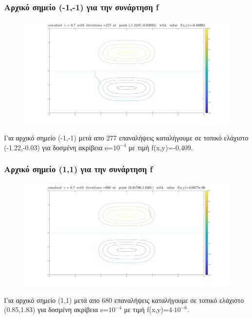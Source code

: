 \documentclass{article}
\begin{document}
\subsubsection*{Αρχικό σημείο (-1,-1) για την συνάρτηση f}
\begin{figure}[h!]	
     \centering  
     \advance\leftskip-0.2cm  
  \includegraphics[width=140mm,scale=2]{t1b.jpg}
\end{figure} 
Για αρχικό σημείο (-1,-1) μετά απο 277 επαναλήψεις καταλήγουμε σε τοπικό ελάχιστο (-1.22,-0.03) για  δοσμένη ακρίβεια e=$10^{-4}$ με τιμή f(x,y)=-0.409.
\clearpage
\subsubsection*{Αρχικό σημείο (1,1) για την συνάρτηση f}
\begin{figure}[h!]	
     \centering  
     \advance\leftskip-0.2cm  
  \includegraphics[width=140mm,scale=2]{t1c.jpg}
\end{figure} 
Για αρχικό σημείο (1,1) μετά απο 680 επαναλήψεις καταλήγουμε σε τοπικό ελάχιστο (0.85,1.83) για δοσμένη ακρίβεια e=$10^{-4}$ με τιμή f(x,y)=4$\cdot 10^{-6}$.
\end{document}

